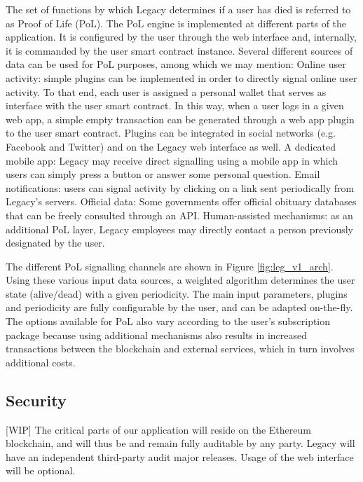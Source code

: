 The set of functions by which Legacy determines if a user has died is referred to as Proof of Life (PoL). The PoL engine is implemented at different parts of the application. It is configured by the user through the web interface and, internally, it is commanded by the user smart contract instance. Several different sources of data can be used for PoL purposes, among which we may mention:
Online user activity: simple plugins can be implemented in order to directly signal online user activity. To that end, each user is assigned a personal wallet that serves as interface with the user smart contract. In this way, when a user logs in a given web app, a simple empty transaction can be generated through a web app plugin to the user smart contract. Plugins can be integrated in social networks (e.g. Facebook and Twitter) and on the Legacy web interface as well.
A dedicated mobile app: Legacy may receive direct signalling using a mobile app in which users can simply press a button or answer some personal question.
Email notifications: users can signal activity by clicking on a link sent periodically from Legacy’s servers. 
Official data: Some governments offer official obituary databases that can be freely consulted through an API.  
Human-assisted mechanisms: as an additional PoL layer, Legacy employees may directly contact a person previously designated by the user.

The different PoL signalling channels are shown in Figure \ref{fig:leg_v1_arch}. Using these various input data sources, a weighted algorithm determines the user state (alive/dead) with a given periodicity. The main input parameters, plugins and periodicity are fully configurable by the user, and can be adapted on-the-fly. The options available for PoL also vary according to the user’s subscription package because using additional mechanisms also results in increased transactions between the blockchain and external services, which in turn involves additional costs. 

\subsection{Security} %
\label{sub:security}
[WIP]
The critical parts of our application will reside on the Ethereum blockchain, and will thus be and remain fully auditable by any party. Legacy will have an independent third-party audit major releases. Usage of the web interface will be optional.

